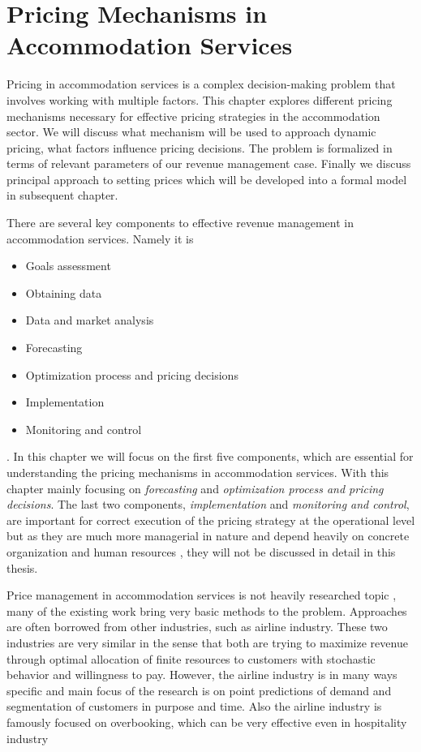 \chapter{Pricing Mechanisms in Accommodation Services}
Pricing in accommodation services is a complex decision-making problem that involves working with multiple factors. This chapter explores different pricing mechanisms necessary for effective pricing strategies in the accommodation sector. We will discuss what mechanism will be used to approach dynamic pricing, what factors influence pricing decisions. The problem is formalized in terms of relevant parameters of our revenue management case. Finally we discuss principal approach to setting prices which will be developed into a formal model in subsequent chapter.

There are several key components to effective revenue management in accommodation services. Namely it is
\begin{itemize}
    \item Goals assessment
    \item Obtaining data
    \item Data and market analysis
    \item Forecasting
    \item Optimization process and pricing decisions
    \item Implementation
    \item Monitoring and control
\end{itemize}
\cite{IVANOV2014}. In this chapter we will focus on the first five components, which are essential for understanding the pricing mechanisms in accommodation services. With this chapter mainly focusing on \textit{forecasting} and \textit{optimization process and pricing decisions}. The last two components, \textit{implementation} and \textit{monitoring and control}, are important for correct execution of the pricing strategy at the operational level but as they are much more managerial in nature and depend heavily on concrete organization and human resources \cite{PETRICEK2021}, they will not be discussed in detail in this thesis.

Price management in accommodation services is not heavily researched topic \cite{ANDERSONXIE2016}, many of the existing work bring very basic methods to the problem. Approaches are often borrowed from other industries, such as airline industry. These two industries are very similar in the sense that both are trying to maximize revenue through optimal allocation of finite resources to customers with stochastic behavior and willingness to pay. However, the airline industry is in many ways specific and main focus of the research is on point predictions of demand \cite{FIORI2020102332} and segmentation of customers in purpose and time. Also the airline industry is famously focused on overbooking, which can be very effective even in hospitality industry \cite{}
